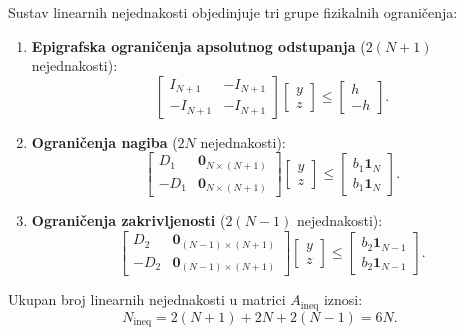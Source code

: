 Sustav linearnih nejednakosti objedinjuje tri grupe fizikalnih ograničenja:
\begin{enumerate}
    \item \textbf{Epigrafska ograničenja apsolutnog odstupanja} ($2(N+1)$ nejednakosti):
    \begin{equation}
    \begin{bmatrix} I_{N+1} & -I_{N+1} \\ -I_{N+1} & -I_{N+1} \end{bmatrix} \begin{bmatrix} y \\ z \end{bmatrix} \leq \begin{bmatrix} h \\ -h \end{bmatrix}.
    \end{equation}
    \item \textbf{Ograničenja nagiba} ($2N$ nejednakosti):
    \begin{equation}
    \begin{bmatrix} D_1 & \mathbf{0}_{N \times (N+1)} \\ -D_1 & \mathbf{0}_{N \times (N+1)} \end{bmatrix} \begin{bmatrix} y \\ z \end{bmatrix} \leq \begin{bmatrix} b_1 \mathbf{1}_N \\ b_1 \mathbf{1}_N \end{bmatrix}.
    \end{equation}
    \item \textbf{Ograničenja zakrivljenosti} ($2(N-1)$ nejednakosti):
    \begin{equation}
    \begin{bmatrix} D_2 & \mathbf{0}_{(N-1) \times (N+1)} \\ -D_2 & \mathbf{0}_{(N-1) \times (N+1)} \end{bmatrix} \begin{bmatrix} y \\ z \end{bmatrix} \leq \begin{bmatrix} b_2 \mathbf{1}_{N-1} \\ b_2 \mathbf{1}_{N-1} \end{bmatrix}.
    \end{equation}
\end{enumerate}
Ukupan broj linearnih nejednakosti u matrici $A_{\mathrm{ineq}}$ iznosi:
\begin{equation}
N_{\mathrm{ineq}} = 2(N+1) + 2N + 2(N-1) = 6N.
\end{equation}

